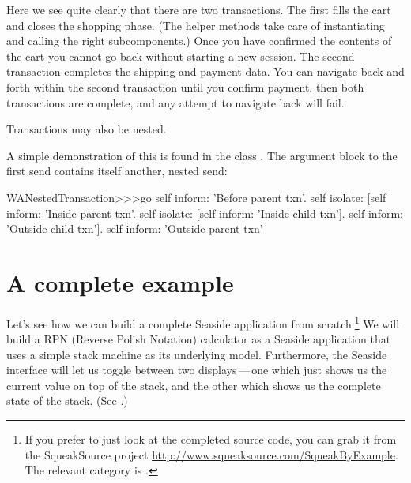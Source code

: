 \documentclass[a4paper,10pt,twoside]{book}
\begin{document}
Here we see quite clearly that there are two transactions.
The first fills the cart and closes the shopping phase.
(The helper methods  \etc take care of instantiating and calling the right subcomponents.)
Once you have confirmed the contents of the cart you cannot go back without starting a new session.
The second transaction completes the shipping and payment data.
You can navigate back and forth within the second transaction until you confirm payment.
then both transactions are complete, and any attempt to navigate back will fail.

Transactions may also be nested.

A simple demonstration of this is found in the class .
The argument block to the first  send contains itself another, nested  send:

\begin{code}{}
WANestedTransaction>>>go
	self inform: 'Before parent txn'.
	self isolate:
			[self inform: 'Inside parent txn'.
			self isolate: [self inform: 'Inside child txn'].
			self inform: 'Outside child txn'].
	self inform: 'Outside parent txn'
\end{code}


\section{A complete example}


Let's see how we can build a complete Seaside application from scratch.\footnote{If you prefer to just look at the completed source code, you can grab it from the SqueakSource project \url{http://www.squeaksource.com/SqueakByExample}.
The relevant category is .}
We will build a RPN (Reverse Polish Notation) calculator as a Seaside application that uses a simple stack machine as its underlying model.
Furthermore, the Seaside interface will let us toggle between two displays\,---\,one which just shows us the current value on top of the stack, and the other which shows us the complete state of the stack.
(See .)
\end{document}
